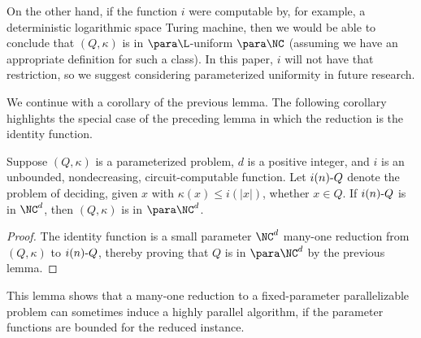 On the other hand, if the function $i$ were computable by, for example, a deterministic logarithmic space Turing machine, then we would be able to conclude that $(Q, \kappa)$ is in $\para \L$-uniform $\para \NC$ (assuming we have an appropriate definition for such a class).
In this paper, $i$ will not have that restriction, so we suggest considering parameterized uniformity in future research.

We continue with a corollary of the previous lemma.
The following corollary highlights the special case of the preceding lemma in which the reduction is the identity function.

\begin{corollary}\label{cor:sprself}
  Suppose $(Q, \kappa)$ is a parameterized problem, $d$ is a positive integer, and $i$ is an unbounded, nondecreasing, circuit-computable function.
  Let $i(n) \textnormal{-} Q$ denote the problem of deciding, given $x$ with $\kappa(x) \leq i(|x|)$, whether $x \in Q$.
  If $i(n) \textnormal{-} Q$ is in $\NC^d$, then $(Q, \kappa)$ is in $\para \NC^d$.
\end{corollary}
\begin{proof}
  The identity function is a small parameter $\NC^d$ many-one reduction from $(Q, \kappa)$ to $i(n) \textnormal{-} Q$, thereby proving that $Q$ is in $\para \NC^d$ by the previous lemma.
\end{proof}

This lemma shows that a many-one reduction to a fixed-parameter parallelizable problem can sometimes induce a highly parallel algorithm, if the parameter functions are bounded for the reduced instance.


